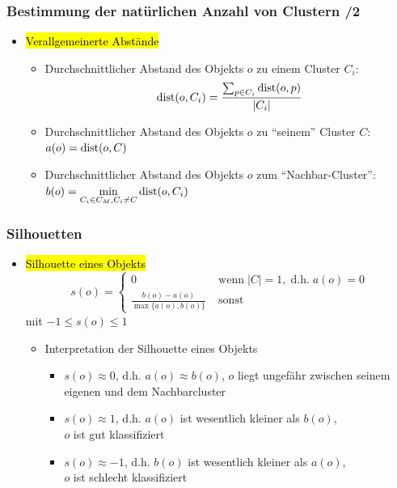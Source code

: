 
\begin{frame}
\frametitle{Bestimmung der natürlichen Anzahl von Clustern /2}

\begin{itemize}
\item \hl{Verallgemeinerte Abstände}
\begin{itemize}
\item Durchschnittlicher Abstand des Objekts $o$ zu einem Cluster
  $C_i$:
$$\operatorname{dist}(o,C_i)=\frac{\sum_{p\in C_i}\operatorname{dist}(o,p)}{|C_i|}$$
\item Durchschnittlicher Abstand des Objekts $o$ zu "`seinem"' Cluster
  $C$: $a(o) = \operatorname{dist}(o,C)$
\item Durchschnittlicher Abstand des Objekts $o$ zum "`Nachbar-Cluster"':
$b(o)=\displaystyle\min_{C_i \in C_M, C_i\neq C} \operatorname{dist}(o, C_i)$
\end{itemize}
\end{itemize}

\end{frame}


\begin{frame}
\frametitle{Silhouetten}

\begin{itemize}
\item \hl{Silhouette eines Objekts}
$$
s(o)=
\begin{cases}
0 & \text{wenn}\;|C|=1,\;\text{d.h.}\;a(o)=0 \\
\frac{b(o)-a(o)}{\max\{a(o),b(o)\}}\;&\text{sonst}
\end{cases}
$$
 mit $-1 \leq s(o) \leq 1$
\begin{itemize}
\item Interpretation der Silhouette eines Objekts
\begin{itemize}
\item $s(o) \approx 0$, d.h. $a(o)\approx b(o)$, $o$ liegt ungefähr
  zwischen seinem eigenen und dem Nachbarcluster
\item $s(o) \approx 1$, d.h. $a(o)$ ist wesentlich kleiner als $b(o)$,\\
  $o$ ist gut klassifiziert
\item $s(o) \approx -1$, d.h. $b(o)$ ist wesentlich kleiner als
  $a(o)$,\\ $o$ ist schlecht klassifiziert
\end{itemize}
\end{itemize}
\end{itemize}
\end{frame}

